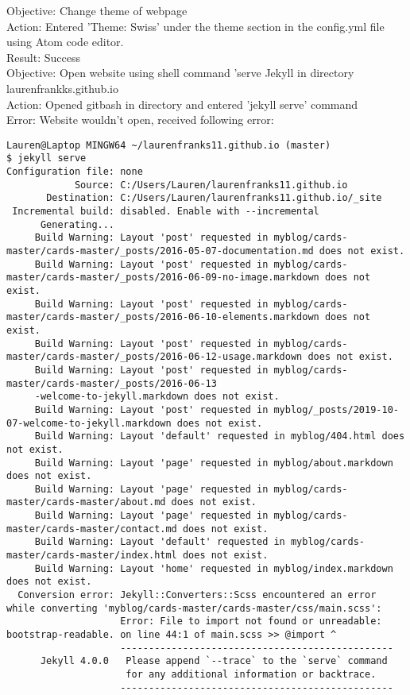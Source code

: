 \documentclass{article}
\begin{document}
Objective: Change theme of webpage\\
Action: Entered 'Theme: Swiss' under the theme section in the config.yml file using Atom code editor.\\ 
Result: Success\\

Objective: Open website using shell command 'serve Jekyll in directory laurenfrankks.github.io\\
Action: Opened gitbash in directory and entered 'jekyll serve' command \\
Error: Website wouldn't open, received following error:
\begin{verbatim}
Lauren@Laptop MINGW64 ~/laurenfranks11.github.io (master)
$ jekyll serve
Configuration file: none
            Source: C:/Users/Lauren/laurenfranks11.github.io
       Destination: C:/Users/Lauren/laurenfranks11.github.io/_site
 Incremental build: disabled. Enable with --incremental
      Generating...
     Build Warning: Layout 'post' requested in myblog/cards-master/cards-master/_posts/2016-05-07-documentation.md does not exist.
     Build Warning: Layout 'post' requested in myblog/cards-master/cards-master/_posts/2016-06-09-no-image.markdown does not exist.
     Build Warning: Layout 'post' requested in myblog/cards-master/cards-master/_posts/2016-06-10-elements.markdown does not exist.
     Build Warning: Layout 'post' requested in myblog/cards-master/cards-master/_posts/2016-06-12-usage.markdown does not exist.
     Build Warning: Layout 'post' requested in myblog/cards-master/cards-master/_posts/2016-06-13
     -welcome-to-jekyll.markdown does not exist.
     Build Warning: Layout 'post' requested in myblog/_posts/2019-10-07-welcome-to-jekyll.markdown does not exist.
     Build Warning: Layout 'default' requested in myblog/404.html does not exist.
     Build Warning: Layout 'page' requested in myblog/about.markdown does not exist.
     Build Warning: Layout 'page' requested in myblog/cards-master/cards-master/about.md does not exist.
     Build Warning: Layout 'page' requested in myblog/cards-master/cards-master/contact.md does not exist.
     Build Warning: Layout 'default' requested in myblog/cards-master/cards-master/index.html does not exist.
     Build Warning: Layout 'home' requested in myblog/index.markdown does not exist.
  Conversion error: Jekyll::Converters::Scss encountered an error while converting 'myblog/cards-master/cards-master/css/main.scss':
                    Error: File to import not found or unreadable: bootstrap-readable. on line 44:1 of main.scss >> @import ^
                    ------------------------------------------------
      Jekyll 4.0.0   Please append `--trace` to the `serve` command
                     for any additional information or backtrace.
                    ------------------------------------------------
\end{verbatim}
\end{document}
